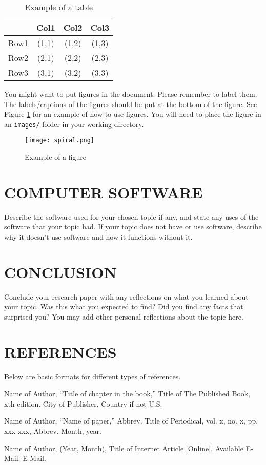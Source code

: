 \documentclass[letterpaper, 10 pt, conference]{IEEEconf}
\begin{document}
\begin{table}[h!]
\begin{center}
\begin{tabular}{||c | c | c | c||} 
\hline
  & Col1 & Col2 & Col3 \\ [0.5ex]
\hline\hline
Row1 & (1,1) & (1,2) & (1,3) \\ 
\hline
Row2 & (2,1) & (2,2) & (2,3) \\
\hline
Row3 & (3,1) & (3,2) & (3,3) \\
\hline
\end{tabular}
\caption{Example of a table}
\label{tbl:example}
\end{center}
\end{table}

You might want to put figures in the document. Please
remember to label them. The labels/captions of the figures
should be put at the bottom of the figure. See Figure
\ref{fig:example} for an example of how to use figures.
You will need to place the figure in an \texttt{images/} folder
in your working directory.

\begin{figure}[h!]
\centering
\texttt{[image: spiral.png]}
\caption{Example of a figure}
\label{fig:example}
\end{figure} 

\section{COMPUTER SOFTWARE}

Describe the software used for your chosen topic if any,
and state any uses of the software that your topic had.
If your topic does not have or use software, describe why it
doesn't use software and how it functions without it.

\section{CONCLUSION}

Conclude your research paper with any reflections on what you
learned about your topic. Was this what you expected to find?
Did you find any facts that surprised you? You may add other
personal reflections about the topic here.

\section*{REFERENCES}

Below are basic formats for different types of references.

\begin{enumerate}[label={[\arabic*]}]
\item Name of Author, ``Title of chapter in the book,''
Title of The Published Book, xth edition. City of
Publisher, Country if not U.S.
\item Name of Author, “Name of paper,” Abbrev.
Title of Periodical, vol. x, no. x, pp. xxx-xxx,
Abbrev. Month, year.
\item Name of Author, (Year, Month),
Title of Internet Article [Online]. Available E-Mail:
E-Mail.
\end{enumerate}
\end{document}

